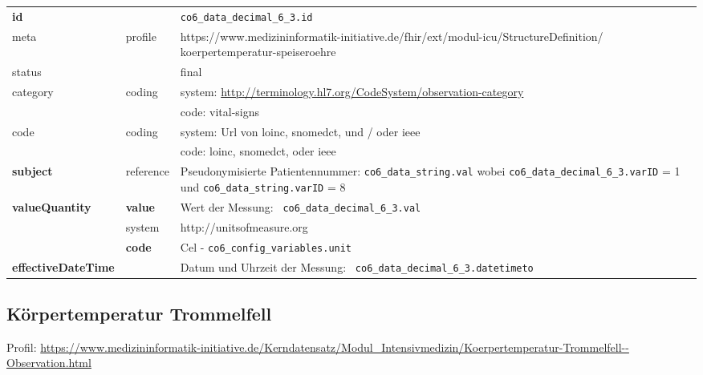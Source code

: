 \begin{longtable}{|l|l|p{7.5cm}|}
	\hline
	\rowcolor{lightgray} \multicolumn{3}{|l|}{Data Mapping (inhaltlich)} \\ \hline
	\textbf{id} &  & \texttt{co6\_data\_decimal\_6\_3.id} \\ \hline
	meta & profile & https://www.medizininformatik-initiative.de/fhir/ext/modul-icu/StructureDefinition/
	koerpertemperatur-speiseroehre \\ \hline 
	status &  & final   \\ \hline 
	category & coding & system: \url{http://terminology.hl7.org/CodeSystem/observation-category} \\
	\cline{3-3}
	& & code: vital-signs \\ \hline
	code & coding & system: Url von \ac{loinc}, \ac{snomedct}, und / oder \ac{ieee} \\ 
	\cline{3-3} 
	&  & code: \ac{loinc}, \ac{snomedct}, oder \ac{ieee} \\ \hline
	\textbf{subject} & reference & Pseudonymisierte Patientennummer: \texttt{co6\_data\_string.val} wobei \texttt{co6\_data\_decimal\_6\_3.varID} = 1 und \texttt{co6\_data\_string.varID} = 8 \\ \hline
	\textbf{valueQuantity}  & \textbf{value} & Wert der Messung: \texttt{
		co6\_data\_decimal\_6\_3.val} \\
	\cline{2-3}
	& system & http://unitsofmeasure.org \\
	\cline{2-3}
	& \textbf{code} & Cel - \texttt{co6\_config\_variables.unit} \\ \hline
	\textbf{effectiveDateTime}  & & Datum und Uhrzeit der Messung: \texttt{
		co6\_data\_decimal\_6\_3.datetimeto} \\ \hline
\end{longtable}

\subsection{Körpertemperatur Trommelfell}

Profil: \url{https://www.medizininformatik-initiative.de/Kerndatensatz/Modul_Intensivmedizin/Koerpertemperatur-Trommelfell--Observation.html}

